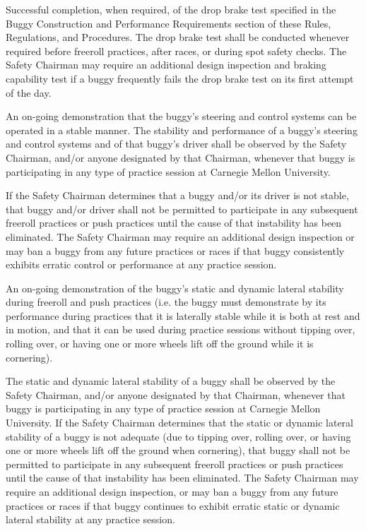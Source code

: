 	Successful completion, when required, of the drop brake test specified in the
	Buggy Construction and Performance Requirements section of these Rules,
	Regulations, and Procedures. The drop brake test shall be conducted whenever
	required before freeroll practices, after races, or during spot safety checks.
	The Safety Chairman may require an additional design inspection and braking
	capability test if a buggy frequently fails the drop brake test on its first
	attempt of the day.

	An on-going demonstration that the buggy's steering and control systems can be
	operated in a stable manner. The stability and performance of a buggy's
	steering and control systems and of that buggy's driver shall be observed by
	the Safety Chairman, and/or anyone designated by that Chairman, whenever that
	buggy is participating in any type of practice session at Carnegie Mellon
	University.

	If the Safety Chairman determines that a buggy and/or its driver is not stable,
	that buggy and/or driver shall not be permitted to participate in any
	subsequent freeroll practices or push practices until the cause of that
	instability has been eliminated. The Safety Chairman may require an additional
	design inspection or may ban a buggy from any future practices or races if that
	buggy consistently exhibits erratic control or performance at any practice
	session.

	An on-going demonstration of the buggy's static and dynamic lateral stability
	during freeroll and push practices (i.e. the buggy must demonstrate by its
	performance during practices that it is laterally stable while it is both at
	rest and in motion, and that it can be used during practice sessions without
	tipping over, rolling over, or having one or more wheels lift off the ground
	while it is cornering).

	The static and dynamic lateral stability of a buggy shall be observed by the
	Safety Chairman, and/or anyone designated by that Chairman, whenever that buggy
	is participating in any type of practice session at Carnegie Mellon University.
	If the Safety Chairman determines that the static or dynamic lateral stability
	of a buggy is not adequate (due to tipping over, rolling over, or having one or
	more wheels lift off the ground when cornering), that buggy shall not be
	permitted to participate in any subsequent freeroll practices or push practices
	until the cause of that instability has been eliminated. The Safety Chairman
	may require an additional design inspection, or may ban a buggy from any future
	practices or races if that buggy continues to exhibit erratic static or dynamic
	lateral stability at any practice session.

